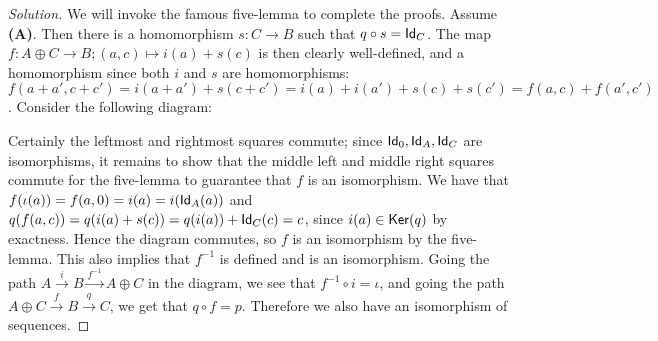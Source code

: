 \begin{proof}[Solution]
   We will invoke the famous five-lemma to complete the proofs. Assume \textbf{(A)}. Then there is a homomorphism $s: C \to B$ such that $q \circ s = \mathsf{Id}_C$. The map $f: A \oplus C \to B; (a, c) \mapsto i(a) +  s(c)$ is then clearly well-defined, and a homomorphism since both $i$ and $s$ are homomorphisms: $f(a+a', c+c') = i(a+a') +  s(c+c') = i(a) +i(a') + s(c) + s(c') = f(a, c) + f(a', c')$. Consider the following diagram:
      \begin{center}
    \end{center}
 Certainly the leftmost and rightmost squares commute; since $\mathsf{Id}_0, \mathsf{Id}_A, \mathsf{Id}_C$ are isomorphisms, it remains to show that the middle left and middle right squares commute for the five-lemma to guarantee that $f$ is an isomorphism. We have that $f(\iota(a)) = f(a, 0) = i(a) = i(\mathsf{Id}_A(a))$ and $q(f(a, c)) = q(i(a) + s(c)) = q(i(a)) + \mathsf{Id}_C(c) = c$, since $i(a) \in \mathsf{Ker}(q)$ by exactness. Hence the diagram commutes, so $f$ is an isomorphism by the five-lemma. This also implies that $f^{-1}$ is defined and is an isomorphism. Going the path $A \overset{i}{\to} B \overset{f^{-1}}{\to} A\oplus C$ in the diagram, we see that $f^{-1} \circ i = \iota$, and going the path $A\oplus C \overset{f}{\to} B \overset{q}{\to} C$, we get that $q \circ f = p$. Therefore we also have an isomorphism of sequences.


\end{proof}
